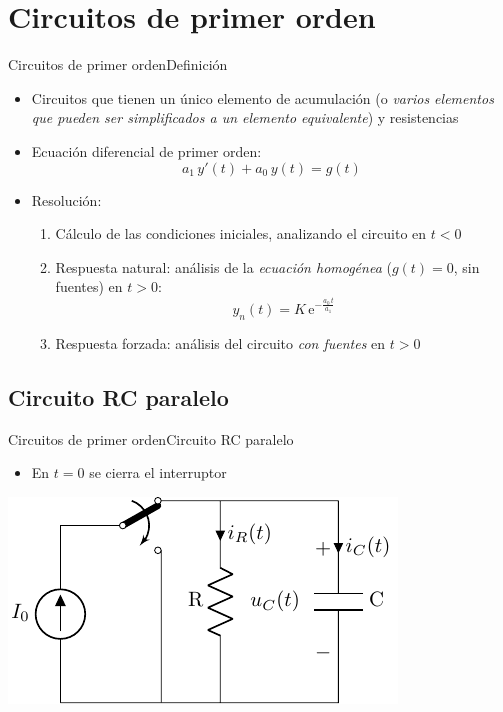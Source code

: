 \documentclass[aspectratio=169, xcolor={usenames,svgnames,dvipsnames}]{beamer}
\begin{document}
\section{Circuitos de primer orden}
\begin{frame}{Circuitos de primer orden}{Definición}
\begin{itemize}
\item Circuitos que tienen un \alert{único elemento de acumulación} (o \emph{varios elementos que pueden ser simplificados a un elemento equivalente}) y resistencias
\item \alert{Ecuación diferencial de primer orden}: 
\begin{equation*}
	    a_1\,y'(t)+a_0\,y(t)=g(t)
	\end{equation*}
	\item Resolución:
	\begin{enumerate}
\item Cálculo de las \alert{condiciones iniciales}, analizando el circuito en \(t < 0\)
\item \alert{Respuesta natural}: análisis de la \emph{ecuación homogénea} ($g(t)=0$, sin fuentes) en \(t > 0\):
\begin{equation*}
    y_n(t)=K\,\mathrm{e}^{-\frac{a_0\,t}{a_1}}
\end{equation*}
\item \alert{Respuesta forzada}: análisis del circuito \emph{con fuentes} en \(t > 0\)
\end{enumerate}
\end{itemize}
\end{frame}

\subsection{Circuito RC paralelo}

\begin{frame}{Circuitos de primer orden}{Circuito RC paralelo}
\begin{itemize}
\item En \(t = 0\) se cierra el interruptor
\end{itemize}

\begin{center}
\includegraphics[height=0.45\textheight]{../figs/transitorio_circuitoRC.pdf}
\end{center}
\end{frame}
\end{document}

